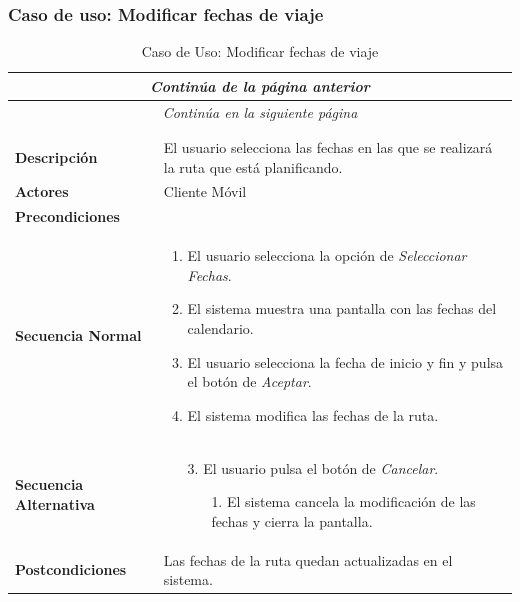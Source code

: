 \newpage
\subsubsection*{Caso de uso: Modificar fechas de viaje}
\begin{longtable}{| p{4cm} | p{10cm} |}
\endfirsthead
\multicolumn{2}{c}{\textit{Continúa de la página anterior}}\\[12pt]
\hline
\endhead
\hline
\multicolumn{2}{c}{\textit{Continúa en la siguiente página}} \\
\endfoot
\hline
\caption{Caso de Uso: Modificar fechas de viaje}\label{fig:1}\\
\endlastfoot


\hline
\multicolumn{2}{|c|}{\textbf{CU$<$07$>$ - Modificar Fechas de Viaje}} \\

\hline
\textbf{Descripción} &
El usuario selecciona las fechas en las que se realizará la ruta que está planificando.\\

\hline
\textbf{Actores} &
Cliente Móvil\\

\hline
\textbf{Precondiciones} &
\\

\hline
\textbf{Secuencia Normal} &\mbox{}\par\vspace{-\baselineskip}
\begin{enumerate}[leftmargin=0.7cm, topsep=0.1cm]
\item El usuario selecciona la opción de \textit{Seleccionar Fechas}.
\item El sistema muestra una pantalla con las fechas del calendario.
\item El usuario selecciona la fecha de inicio y fin y pulsa el botón de \textit{Aceptar}.
\item El sistema modifica las fechas de la ruta.
\end{enumerate}\\

\hline
\textbf{Secuencia Alternativa} &\mbox{}\par\vspace{-\baselineskip}
\begin{enumerate}[leftmargin=0.9cm, topsep=0.1cm]
\item[3.] El usuario pulsa el botón de \textit{Cancelar}.
	\begin{itemize}
	\item[1.] El sistema cancela la modificación de las fechas y cierra la pantalla.
	\end{itemize}
\end{enumerate}
\\

\hline
\textbf{Postcondiciones} & 
Las fechas de la ruta quedan actualizadas en el sistema.\\
\hline
\end{longtable}



